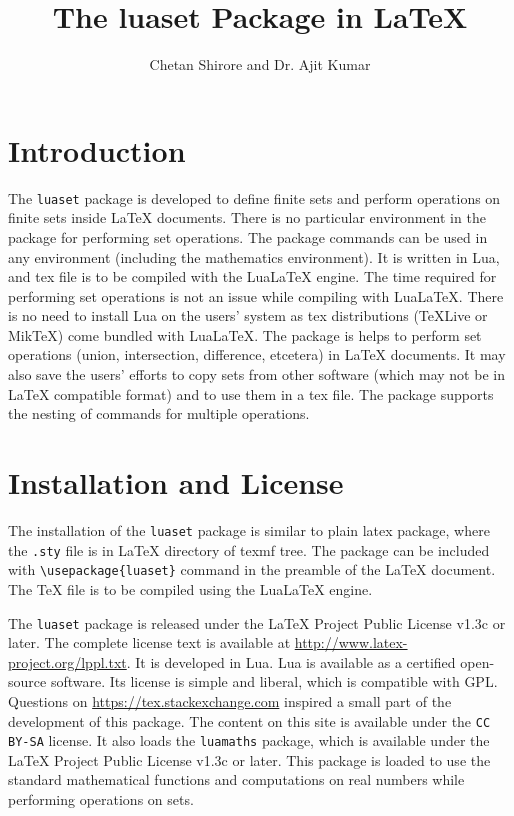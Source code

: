 \documentclass{article}
\begin{document}
\title{The luaset Package in LaTeX}
\author{Chetan Shirore and Dr. Ajit Kumar}
\maketitle
\section{Introduction}\label{section:introduction}
The \verb|luaset| package is developed to define finite sets and perform operations on finite sets inside LaTeX documents. There is no particular environment in the package for performing set operations. The package commands can be used in any environment (including the mathematics environment). It is written in Lua, and tex file is to be compiled with the LuaLaTeX engine. The time required for performing set operations is not an issue while compiling with LuaLaTeX. There is no need to install Lua on the users' system as tex distributions (TeXLive or MikTeX) come bundled with LuaLaTeX. The package is helps to perform set operations (union, intersection, difference, etcetera) in LaTeX documents. It may also save the users' efforts to copy sets from other software (which may not be in LaTeX compatible format) and to use them in a tex file. The package supports the nesting of commands for multiple operations. 

\section{Installation and License}

The installation of the \verb|luaset| package is similar to plain latex package, where the \texttt{.sty} file is in LaTeX directory of texmf tree. The package can be included with \verb|\usepackage{luaset}| command in the preamble of the LaTeX document. The TeX file is to be compiled using the LuaLaTeX engine.

The \verb|luaset| package is released under the LaTeX Project Public License v1.3c or later. The complete license text is available at \url{http://www.latex-project.org/lppl.txt}. It is developed in Lua.  Lua is available as a certified open-source software. Its license is simple and liberal, which is compatible with GPL. Questions on  \url{https://tex.stackexchange.com} inspired a small part of the development of this package. The content on this site is available under the \verb|CC BY-SA| license. It also loads the \verb|luamaths| package, which is available under the LaTeX Project Public License v1.3c or later. This package is loaded to use the standard mathematical functions and computations on real numbers while performing operations on sets.
\end{document}
